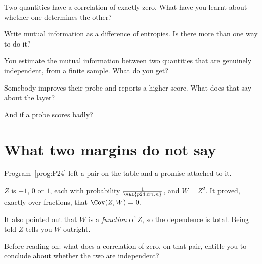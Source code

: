 \begin{quiz}
\item Two quantities have a correlation of exactly zero. What have you
  learnt about whether one determines the other? 
\item Write mutual information as a difference of entropies. Is there more
  than one way to do it? 
\item You estimate the mutual information between two quantities that are
  genuinely independent, from a finite sample. What do you get?
\item Somebody improves their probe and reports a higher score. What does
  that say about the layer? 
\item And if a probe scores badly? 
\end{quiz}

\section{What two margins do not say}
\label{sec:P31-margins}

\begin{fr}
Program~\ref{prog:P24} left a pair on the table and a promise attached to it.

$Z$ is $-1$, $0$ or $1$, each with probability $\frac{1}{\val{p24.tri.n}}$,
and $W = Z^{2}$. It proved, exactly over fractions, that
$\Cov(Z, W) = 0$.

It also pointed out that $W$ is a \emph{function} of $Z$, so the dependence
is total. Being told $Z$ tells you $W$ outright.

Before reading on: what does a correlation of zero, on that pair, entitle
you to conclude about whether the two are independent?
\dotline
\nextframe
\end{fr}

